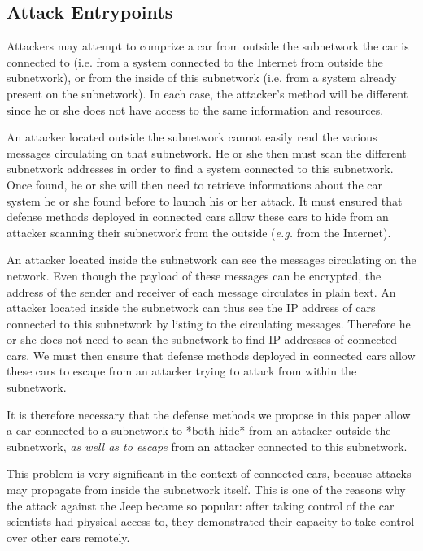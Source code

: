 \subsection {Attack Entrypoints}

Attackers may attempt to comprize a car from outside the subnetwork
the car is connected to (i.e. from a system connected to the Internet
from outside the subnetwork), or from the inside of this subnetwork
(i.e. from a system already present on the subnetwork). In each case,
the attacker's method will be different since he or she does not have
access to the same information and resources.

An attacker located outside the subnetwork cannot easily read the
various messages circulating on that subnetwork. He or she then must
scan the different subnetwork addresses in order to find a system
connected to this subnetwork. Once found, he or she will then need to
retrieve informations about the car system he or she found before to
launch his or her attack. It must ensured that defense methods
deployed in connected cars allow these cars to hide from an attacker
scanning their subnetwork from the outside (\emph{e.g.} from the
Internet).

An attacker located inside the subnetwork can see the messages
circulating on the network. Even though the payload of these messages
can be encrypted, the address of the sender and receiver of each
message circulates in plain text. An attacker located inside the
subnetwork can thus see the IP address of cars connected to this
subnetwork by listing to the circulating messages. Therefore he or she
does not need to scan the subnetwork to find IP addresses of connected
cars. We must then ensure that defense methods deployed in connected
cars allow these cars to escape from an attacker trying to attack from
within the subnetwork.

It is therefore necessary that the defense methods we propose in this
paper allow a car connected to a subnetwork to *both hide* from an
attacker outside the subnetwork, \emph{as well as to escape} from an
attacker connected to this subnetwork.

This problem is very significant in the context of connected cars,
because attacks may propagate from inside the subnetwork itself. This
is one of the reasons why the attack against the Jeep \cite{Jeep} became
so popular: after taking control of the car scientists had physical
access to, they demonstrated their capacity to take control over other
cars remotely.


